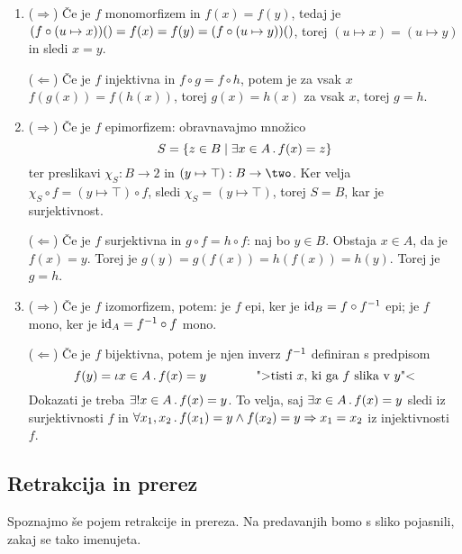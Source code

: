 \begin{dokaz}
  \begin{enumerate}
  \item ($\Rightarrow$) Če je $f$ monomorfizem in $f(x) = f(y)$, tedaj je
  $(f \circ (u \mapsto x)) \unit = f(x) = f(y) = (f \circ (u \mapsto y)) \unit$, torej
  $(u \mapsto x) = (u \mapsto y)$ in sledi $x = y$.

  ($\Leftarrow$) Če je $f$ injektivna in $f \circ g = f \circ h$, potem je za vsak $x$
  $f(g(x)) = f(h(x))$, torej $g(x) = h(x)$ za vsak $x$, torej $g = h$.

  \item
    ($\Rightarrow$) Če je $f$ epimorfizem: obravnavajmo množico
    \begin{equation*}
      S = \set{ z \in B \such \some{x \in A} f(x) = z }
    \end{equation*}
    ter preslikavi $\chi_S : B \to 2$ in $(y \mapsto \top) : B \to \two$. Ker velja
    $\chi_S \circ f = (y \mapsto \top) \circ f$, sledi $\chi_S = (y \mapsto \top)$, torej $S = B$, kar je surjektivnost.

    ($\Leftarrow$) Če je $f$ surjektivna in $g \circ f = h \circ f$: naj bo $y \in B$. Obstaja $x \in A$, da je $f(x) = y$. Torej je $g(y) = g(f(x)) = h(f(x)) = h(y)$.
    Torej je $g = h$.

  \item ($\Rightarrow$) Če je $f$ izomorfizem, potem:
    je $f$ epi, ker je $\id[B] = f \circ \inv{f}$ epi;
    je $f$ mono, ker je $\id[A] = \inv{f} \circ f$ mono.

    ($\Leftarrow$) Če je $f$ bijektivna, potem je njen inverz $\inv{f}$ definiran s predpisom
    \begin{equation*}
      f(y) = \descr{x \in A} f(x) = y \qquad\qquad
      \text{">tisti $x$, ki ga $f$ slika v $y$"<}
    \end{equation*}
    Dokazati je treba $\exactlyone{x \in A} f(x) = y$.
    To velja, saj $\some{x \in A} f(x) = y$ sledi iz surjektivnosti $f$ in
    $\all{x_1, x_2} f(x_1) = y \land f(x_2) = y \lthen x_1 = x_2$ iz injektivnosti~$f$.
  \end{enumerate}
\end{dokaz}

\subsection{Retrakcija in prerez}

Spoznajmo še pojem retrakcije in prereza. Na predavanjih bomo s sliko pojasnili, zakaj se tako imenujeta.

